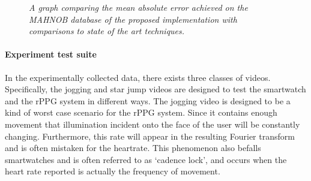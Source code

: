 \begin{figure}
    \centering
    \scalebox{0.6}{}
   \caption{\textit{A graph comparing the mean absolute error achieved on the MAHNOB database of the proposed implementation with comparisons to state of the art techniques.}}
\end{figure}
\paragraph{Experiment test suite}
In the experimentally collected data, there exists three classes of videos. Specifically, the jogging and star jump videos are designed to test the smartwatch and 
the rPPG system in different ways. The jogging video is designed to be a kind of worst case scenario for the rPPG system. Since it contains enough movement that
illumination incident onto the face of the user will be constantly changing. Furthermore, this rate will appear in the resulting Fourier transform and is often mistaken
for the heartrate. This phenomenon also befalls smartwatches and is often referred to as `cadence lock', and occurs when the heart rate reported is actually the frequency 
of movement.

